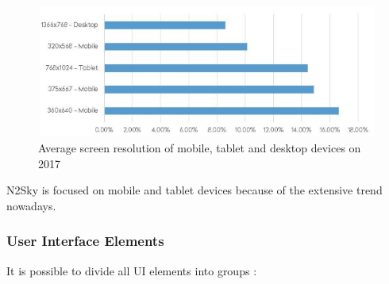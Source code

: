 \begin{figure}[H]
\begin{center}
  \includegraphics[scale=0.65]{components/3/components/screen.png}
  \caption{Average screen resolution of mobile, tablet and desktop devices on 2017}
  \label{fig:screen}
\end{center}
\end{figure}

N2Sky is focused on mobile and tablet devices because of the extensive trend nowadays. 

\subsubsection{User Interface Elements}\label{User Interface Elements}

It is possible to divide all UI elements into groups \cite{intelligent_support}:

